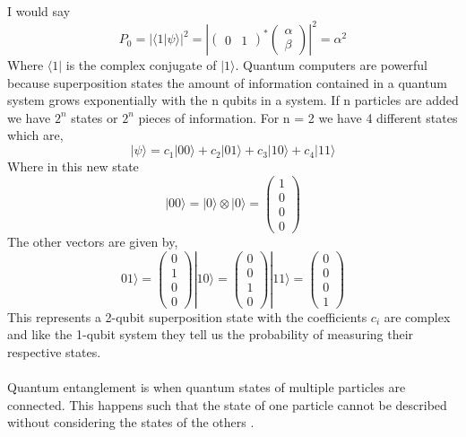 \documentclass{Assignment}
\begin{document}
I would say
 $$P_0=|\langle1|\psi\rangle|^2 = \left| \begin{pmatrix}
 	0&1
 \end{pmatrix}^*\begin{pmatrix}
 	\alpha\\\beta
 \end{pmatrix} \right|^2 = \alpha^2$$
Where $\langle 1|$ is the complex conjugate of $|1\rangle$.
Quantum computers are powerful because superposition states the amount of information contained in a quantum system grows exponentially with the n  qubits in a system.
If n particles are added we have $2^n$ states or $2^n$ pieces of information. 
For n = 2 we have 4 different states which are,
\begin{equation}
	|\psi\rangle =c_1 |00\rangle+c_2 |01\rangle+c_3 |10\rangle+ c_4 |11\rangle
\end{equation}
Where in this new state \begin{equation}|00\rangle = |0\rangle\otimes|0\rangle  =	\begin{pmatrix}
		1\\0\\0\\0
\end{pmatrix}\end{equation}
The other vectors are given by,
$$01\rangle =	\begin{pmatrix}
	0\\1\\0\\0
\end{pmatrix}|10\rangle =	\begin{pmatrix}
	0\\0\\1\\0
\end{pmatrix}|11\rangle =	\begin{pmatrix}
	0\\0\\0\\1
\end{pmatrix} $$
This represents a 2-qubit superposition state with the coefficients $c_i$ are complex and like the 1-qubit system they tell us the probability of measuring their respective states.
\\\\
Quantum entanglement is when quantum states of multiple particles are connected.
This happens such that the state of one particle cannot be described without considering the states of the others \cite{Horodecki_2009}.
\end{document}

